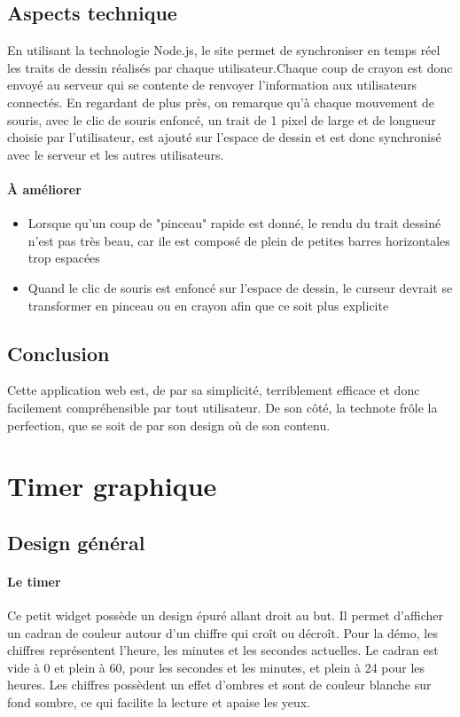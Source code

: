 \documentclass[a4paper,11pt]{article}
\begin{document}
\subsection{Aspects technique}
En utilisant la technologie Node.js, le site permet de synchroniser en temps réel les traits de dessin réalisés par chaque utilisateur.Chaque coup de crayon est donc envoyé au serveur qui se contente de renvoyer l'information aux utilisateurs connectés. En regardant de plus près, on remarque qu'à chaque mouvement de souris, avec le clic de souris enfoncé, un trait de 1 pixel de large et de longueur choisie par l'utilisateur, est ajouté sur l'espace de dessin et est donc synchronisé avec le serveur et les autres utilisateurs.
\paragraph{À améliorer}
\begin{itemize}
\item Lorsque qu'un coup de "pinceau" rapide est donné, le rendu du trait dessiné n'est pas très beau, car ile est composé de plein de petites barres horizontales trop espacées
\item Quand le clic de souris est enfoncé sur l'espace de dessin, le curseur devrait se transformer en pinceau ou en crayon afin que ce soit plus explicite
\end{itemize}
\subsection{Conclusion}
Cette application web est, de par sa simplicité, terriblement efficace et donc facilement compréhensible par tout utilisateur. De son côté, la technote frôle la perfection, que se soit de par son design où de son contenu.

\newpage

\section{Timer graphique}
\subsection{Design général}
\paragraph{Le timer}Ce petit widget possède un design épuré allant droit au but. Il permet d'afficher un cadran de couleur autour d'un chiffre qui croît ou décroît. Pour la démo, les chiffres représentent l'heure, les minutes et les secondes actuelles. Le cadran est vide à 0 et plein à 60, pour les secondes et les minutes, et plein à 24 pour les heures. Les chiffres possèdent un effet d'ombres et sont de couleur blanche sur fond sombre, ce qui facilite la lecture et apaise les yeux.
\end{document}
